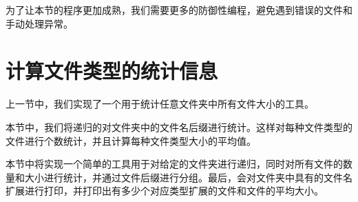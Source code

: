 为了让本节的程序更加成熟，我们需要更多的防御性编程，避免遇到错误的文件和手动处理异常。


\section{计算文件类型的统计信息}

上一节中，我们实现了一个用于统计任意文件夹中所有文件大小的工具。

本节中，我们将递归的对文件夹中的文件名后缀进行统计。这样对每种文件类型的文件进行个数统计，并且计算每种文件类型大小的平均值。


本节中将实现一个简单的工具用于对给定的文件夹进行递归，同时对所有文件的数量和大小进行统计，并通过文件后缀进行分组。最后，会对文件夹中具有的文件名扩展进行打印，并打印出有多少个对应类型扩展的文件和文件的平均大小。


